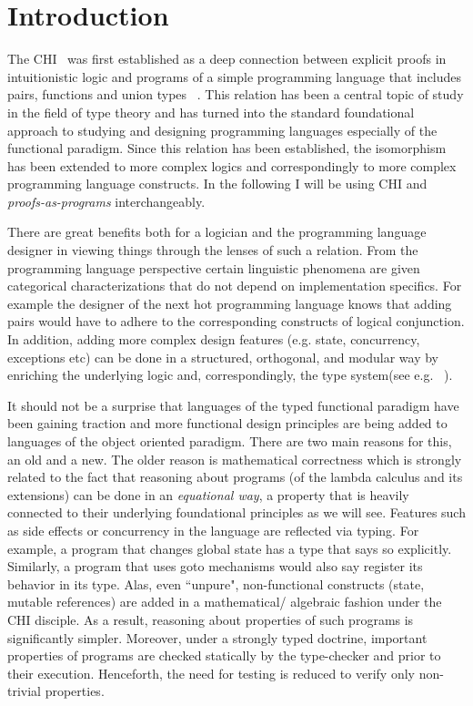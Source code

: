 \chapter{Introduction}\label{intro}
The \acrfull{CHI}~\cite{curry1934functionality,howard1995formulae} was first established as a deep connection between explicit proofs in intuitionistic logic and programs of a simple programming 
language that includes pairs, functions and union types ~\cite{Pierce:2002:TPL:509043,Srensen98lectureson}. This relation has been a central topic of study in the field of type theory and has turned into the standard
foundational approach to studying and designing programming languages especially of the functional paradigm. Since  this relation has been  established, the 
isomorphism has been extended to more complex logics and correspondingly to more complex programming language constructs.  
In the following I will be using \acrfull{CHI} and \emph{proofs-as-programs} interchangeably.

There are great benefits both for a logician
and the programming language designer in viewing things through the lenses of such a relation. From the programming language perspective certain linguistic phenomena are given categorical characterizations that do not 
depend on implementation specifics. 
For example the designer of the next hot programming language  
knows that adding pairs would have to adhere to the corresponding constructs of 
logical conjunction. In addition, adding more complex design features 
(e.g. state, concurrency, exceptions etc) can be done in a structured, orthogonal, 
and modular way by enriching the underlying logic  and, 
correspondingly, the type system(see e.g. ~\cite{Harper:2012:PFP:2431407,CERVESATO20091044,Ong:1997:CFF:263699.263722,DBLP:conf/popl/Griffin90}).

It should not be a surprise that languages of the typed functional paradigm  
have been gaining traction and more functional design principles are being added 
to languages of the object oriented paradigm. There are two main reasons for this, 
an old and a new. The older reason is mathematical correctness which is strongly 
related to the fact that reasoning about programs (of the lambda calculus and its extensions) 
can be done in an \textit{equational way}, a property that is heavily connected 
to their underlying foundational principles as we will see. Features such as side effects 
or concurrency in the language are reflected via typing. For example,  
a program that changes global state has a type that  says so explicitly. Similarly,  
a program that uses goto mechanisms  would also say register its behavior in its type. 
Alas, even ``unpure", non-functional constructs (state, mutable references) are added 
in a mathematical/ algebraic fashion under the \ac{CHI} disciple. 
As a result, reasoning about properties of such programs is significantly simpler. 
Moreover, under a strongly typed doctrine, important properties of programs are checked 
statically by the type-checker and prior to their execution. 
Henceforth, the need for testing is reduced to verify only non-trivial properties. 


